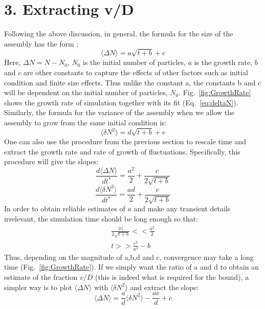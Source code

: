 \documentclass[amsmath,preprintnumbers,10pt,nofootinbib,prl,twocolumn]{revtex4-1}
\begin{document}
\section{3. Extracting v/D}
Following the above discussion, in general, the formula for the size of the assembly has the form :
\begin{equation}
\label{eq:deltaN}
 \langle\Delta N\rangle=a\sqrt{t+b}+c
\end{equation}
Here, $\Delta N = N - N_0$, $N_0$ is the initial number of particles, $a$ is the growth rate, $b$ and  $c$ are other constants to capture the effects of other factors such as initial condition and finite size effects. Thus unlike the constant a, the constants b and c will be dependent on the initial number of particles, $N_0$. Fig.~\ref{fig:GrowthRate} shows the growth rate of simulation together with its fit (Eq.~\ref{eq:deltaN}). Similarly, the formula for the variance of the assembly when we allow the assembly to grow from the same initial condition is:
\begin{equation}
\langle\delta N^2\rangle =d\sqrt{t+b}+e
\end{equation}
One can also use the procedure from the previous section to rescale time and extract the growth rate and rate of growth of fluctuations. 
Specifically, this procedure will give the slopes:
\begin{equation}
\frac{d\langle\Delta N \rangle}{dt^{*}}=\frac{a^2}{2}+\frac{c}{2\sqrt{t+b}}
\end{equation}
\begin{equation}
\frac{d\langle\delta N^2 \rangle}{dt^{*}}=\frac{ad}{2}+\frac{c}{2\sqrt{t+b}}
\end{equation}
In order to obtain reliable estimates of $a$ and make any transient details irrelevant, the simulation time should be long enough so that: 
\begin{equation}
\begin{split}
\frac{|c|}{2\sqrt{t+b}}<<\frac{a^2}{2}
\\ t >>\frac{c^2}{a^4}-b
\end{split}
\end{equation}
Thus, depending on the magnitude of a,b,d and c, convergence may take a long time (Fig.~\ref{fig:GrowthRate}). 
If we simply want the ratio of a and d to obtain an estimate of the fraction $v/D$ (this is indeed what is required for the bound), a simpler way is to plot $\langle\Delta N\rangle$ with  $\langle\delta N^2 \rangle$ and extract the slope:
\begin{equation}
\label{eq:extractvd}
\langle\Delta N\rangle=\frac{a}{d}\langle\delta N^2 \rangle-\frac{ae}{d}+c
\end{equation}
\end{document}
